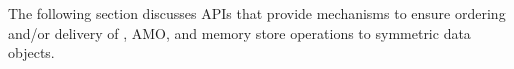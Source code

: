 The following section discusses \openshmem \ac{API}s that provide mechanisms to ensure ordering and/or delivery of , \ac{AMO}, and memory store operations to symmetric data 
objects. 
